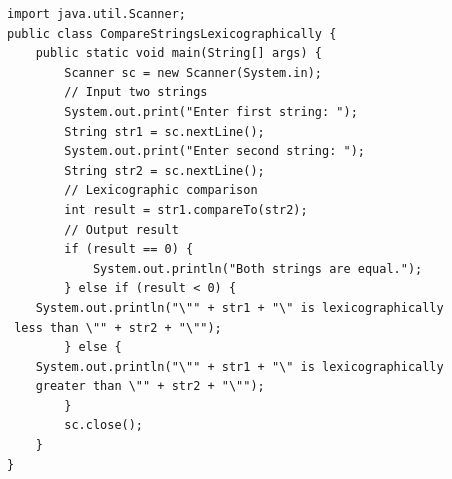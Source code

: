 \begin{verbatim}
import java.util.Scanner;
public class CompareStringsLexicographically {
    public static void main(String[] args) {
        Scanner sc = new Scanner(System.in);
        // Input two strings
        System.out.print("Enter first string: ");
        String str1 = sc.nextLine();
        System.out.print("Enter second string: ");
        String str2 = sc.nextLine();
        // Lexicographic comparison
        int result = str1.compareTo(str2);
        // Output result
        if (result == 0) {
            System.out.println("Both strings are equal.");
        } else if (result < 0) {
    System.out.println("\"" + str1 + "\" is lexicographically 
 less than \"" + str2 + "\"");
        } else {
    System.out.println("\"" + str1 + "\" is lexicographically
    greater than \"" + str2 + "\"");
        }
        sc.close();
    }
}

\end{verbatim}
